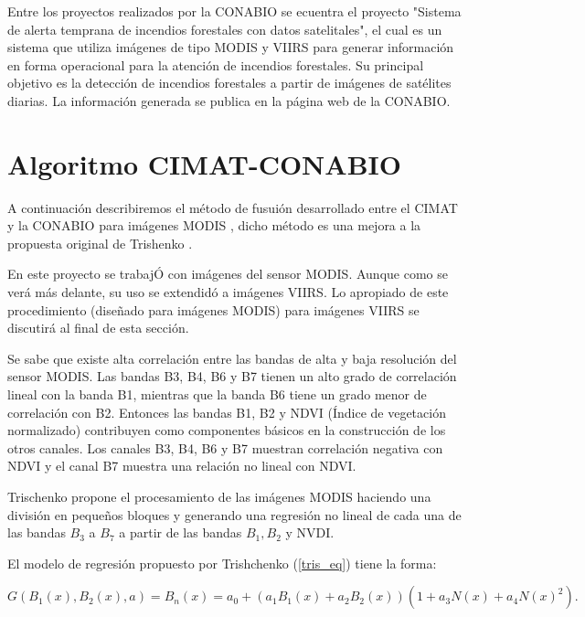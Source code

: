 Entre los proyectos realizados por la CONABIO se ecuentra el proyecto "Sistema de alerta temprana de incendios forestales con datos satelitales", el cual es un sistema que utiliza imágenes de tipo MODIS y VIIRS para generar información en forma operacional para la atención de incendios forestales. Su principal objetivo es la detección de incendios forestales a partir de imágenes de satélites diarias. La información generada se publica en la página web de la CONABIO. 

\section{Algoritmo CIMAT-CONABIO}

A continuación describiremos el método de fusuión desarrollado entre el CIMAT y la CONABIO para imágenes MODIS \cite{Judith}, dicho método es una mejora a la propuesta original de Trishenko \cite{Trish}.

En este proyecto se trabajÓ con imágenes del sensor MODIS. Aunque como se verá más delante, su uso se extendidó a imágenes VIIRS. Lo apropiado de este procedimiento (diseñado para imágenes MODIS) para imágenes VIIRS se discutirá al final de esta sección. 

Se sabe que existe alta correlación entre las bandas de alta y baja resolución del sensor MODIS. Las bandas B3, B4, B6 y B7 tienen un alto grado de correlación lineal con la banda B1, mientras que la banda B6 tiene un grado menor de correlación con B2. Entonces las bandas B1, B2 y NDVI (Índice de vegetación normalizado) contribuyen como componentes básicos en la construcción de los otros canales. Los canales B3, B4, B6 y B7 muestran correlación negativa con NDVI y el canal B7 muestra una relación no lineal con NDVI.

Trischenko propone el procesamiento de las imágenes MODIS haciendo una división en pequeños bloques y generando una regresión no lineal de cada una de las bandas  $B_{3}$ a $B_{7}$ a partir de las bandas $B_{1}, B_{2}$ y NVDI. 

El modelo de regresión propuesto por Trishchenko (\ref{tris_eq}) tiene la forma: 

\begin{equation}\label{tris_eq}
G(B_{1}(x), B_{2}(x),a) = B_{n}(x) = a_{0} + (a_{1}B_{1}(x) + a_{2}B_{2}(x))(1 + a_{3}N(x) + a_{4}N(x)^{2}).
\end{equation}

